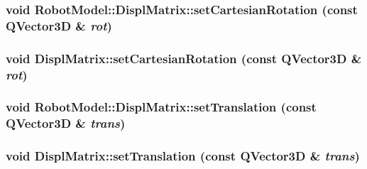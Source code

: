 \label{class_robot_model_1_1_displ_matrix_ab976907c6be66c0aee20a24991ce4159}
\hypertarget{class_robot_model_1_1_displ_matrix_af04654a74406a7e759ccfc25a443df08}{
\subsubsection[{setCartesianRotation}]{\setlength{\rightskip}{0pt plus 5cm}void RobotModel::DisplMatrix::setCartesianRotation (const QVector3D \& {\em rot})}}
\label{class_robot_model_1_1_displ_matrix_af04654a74406a7e759ccfc25a443df08}
\hypertarget{class_robot_model_1_1_displ_matrix_a8654f5029974e0154c3c46ec2bb3dbe3}{
\subsubsection[{setCartesianRotation}]{\setlength{\rightskip}{0pt plus 5cm}void DisplMatrix::setCartesianRotation (const QVector3D \& {\em rot})}}
\label{class_robot_model_1_1_displ_matrix_a8654f5029974e0154c3c46ec2bb3dbe3}
\hypertarget{class_robot_model_1_1_displ_matrix_a7b44ee5a63496a322eb138b6b99da0ae}{
\subsubsection[{setTranslation}]{\setlength{\rightskip}{0pt plus 5cm}void RobotModel::DisplMatrix::setTranslation (const QVector3D \& {\em trans})}}
\label{class_robot_model_1_1_displ_matrix_a7b44ee5a63496a322eb138b6b99da0ae}
\hypertarget{class_robot_model_1_1_displ_matrix_a9ea9b65326be614baea1ea86a2a1b258}{
\subsubsection[{setTranslation}]{\setlength{\rightskip}{0pt plus 5cm}void DisplMatrix::setTranslation (const QVector3D \& {\em trans})}}
